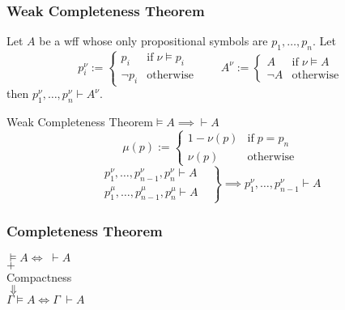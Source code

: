 \documentclass[UTF8,aspectratio=43,11pt,colorlinks,compress,openany]{beamer}%
\begin{document}
\begin{frame}\frametitle{Weak Completeness Theorem}
	\begin{lemma}
		Let $A$ be a wff whose only propositional symbols are $p_1,\dots,p_n$. Let
		\[p_i^\nu:=
		\begin{cases}
		p_i &\text{if}\;\nu\vDash p_i\\
		\neg p_i &\text{otherwise}
		\end{cases}\qquad
		 A^\nu:=
		\begin{cases}
		 A &\text{if}\;\nu\vDash A\\
		\neg A &\text{otherwise}
		\end{cases}\]
		then $p_1^\nu,\dots,p_n^\nu\vdash A^\nu$.
	\end{lemma}
	\begin{block}{Weak Completeness Theorem\quad $\vDash A\implies\vdash A$}
		\[\mu(p):=
		\begin{cases}
		1-\nu(p) &\text{if}\;p=p_n\\
		\nu(p) &\text{otherwise}
		\end{cases}
		\]
		\[
		\left.
		\begin{aligned}
		p_1^\nu,\dots,p_{n-1}^\nu,p_n^\nu\vdash A&\\
		p_1^\mu,\dots,p_{n-1}^\mu,p_n^\mu\vdash A&
		\end{aligned}\right\}\implies p_1^\nu,\dots,p_{n-1}^\nu\vdash A
		\]
	\end{block}
\end{frame}

\begin{frame}\frametitle{Completeness Theorem}
	\begin{center}
		$\vDash A\iff\;\vdash A\;\;$\\
		$+$\\
		Compactness\\
		$\Downarrow$\\
		$\Gamma\vDash A\iff\Gamma\;\vdash A$
	\end{center}
\end{frame}
\end{document}
